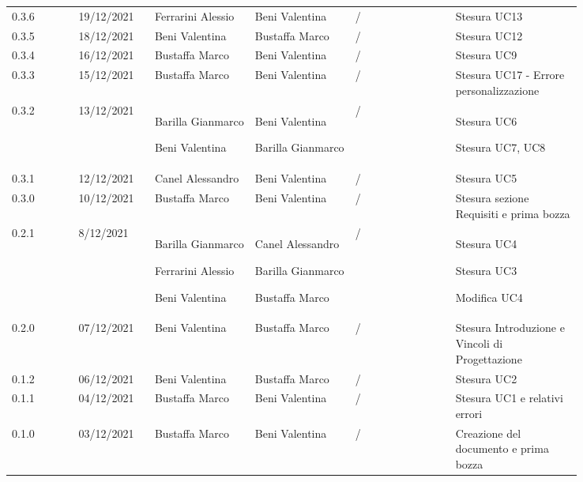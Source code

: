 {\begin{tabular}{p{0.10\linewidth}p{0.10\linewidth}p{0.15\linewidth}p{0.15\linewidth}p{0.15\linewidth}p{0.19\linewidth}}
	\rowcolor[RGB]{233, 245, 206}
	0.3.6 & 19/12/2021 & Ferrarini Alessio& Beni Valentina &/& Stesura UC13\\
	\rowcolor[RGB]{216, 235, 171}
	0.3.5 & 18/12/2021 & Beni Valentina& Bustaffa Marco &/& Stesura UC12\\
	\rowcolor[RGB]{233, 245, 206}
	0.3.4 & 16/12/2021 & Bustaffa Marco& Beni Valentina &/& Stesura UC9\\
	\rowcolor[RGB]{216, 235, 171}
	0.3.3 & 15/12/2021 & Bustaffa Marco& Beni Valentina &/& Stesura UC17 - Errore personalizzazione\\
	\rowcolor[RGB]{233, 245, 206}
	0.3.2 & 13/12/2021 & Barilla Gianmarco \par Beni Valentina& Beni Valentina \par Barilla Gianmarco &/& Stesura UC6 \par Stesura UC7, UC8\\
	\rowcolor[RGB]{216, 235, 171}
	0.3.1 & 12/12/2021 & Canel Alessandro& Beni Valentina &/& Stesura UC5\\
	\rowcolor[RGB]{233, 245, 206}
	0.3.0 & 10/12/2021 & Bustaffa Marco& Beni Valentina &/& Stesura sezione Requisiti e prima bozza\\
	\rowcolor[RGB]{216, 235, 171}
	0.2.1 & 8/12/2021 & Barilla Gianmarco \par Ferrarini Alessio \par Beni Valentina& Canel Alessandro \par Barilla Gianmarco \par Bustaffa Marco&/& Stesura UC4 \par Stesura UC3 \par Modifica UC4 \\
	\rowcolor[RGB]{233, 245, 206}
	0.2.0 & 07/12/2021 & Beni Valentina& Bustaffa Marco &/& Stesura Introduzione e Vincoli di Progettazione\\
	\rowcolor[RGB]{216, 235, 171}
	0.1.2 & 06/12/2021 & Beni Valentina& Bustaffa Marco &/& Stesura UC2\\
	\rowcolor[RGB]{233, 245, 206}
	0.1.1 & 04/12/2021 & Bustaffa Marco& Beni Valentina &/& Stesura UC1 e relativi errori\\
	\rowcolor[RGB]{216, 235, 171}
	0.1.0 & 03/12/2021 & Bustaffa Marco& Beni Valentina &/& Creazione del documento e prima bozza\\
\end{tabular}
}
